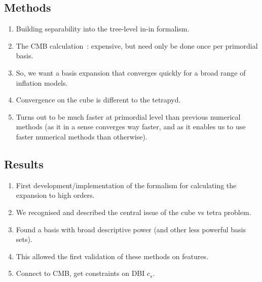     \subsection{Methods}
    \begin{enumerate}
        \item Building separability into the tree-level in-in formalism.
        \item The CMB calculation~\cite{Sohn_2021}: expensive, but need only be done once per primordial basis.
        \item So, we want a basis expansion that converges quickly for a broad range of inflation models.
        \item Convergence on the cube is different to the tetrapyd.
        \item Turns out to be much faster at primordial level than previous numerical methods
            (as it in a sense converges way faster, and as it enables us to use faster numerical methods than otherwise).
    \end{enumerate}
\newpage
    \subsection{Results}
    \begin{enumerate}
        \item First development/implementation of the formalism for calculating the expansion to high orders.
        \item We recognised and described the central issue of the cube vs tetra problem.
        \item Found a basis with broad descriptive power (and other less powerful basis sets).
        \item This allowed the first validation of these methods on features.
        \item Connect to CMB, get constraints on DBI $c_s$.
    \end{enumerate}

